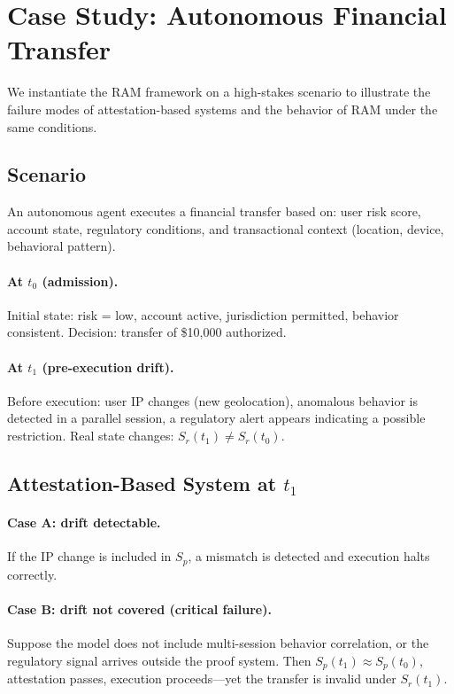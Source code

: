 \documentclass[11pt]{article}
\newcommand{\Sr}{S_r}
\newcommand{\Sp}{S_p}
\begin{document}
\section{Case Study: Autonomous Financial Transfer}
\label{sec:case}

We instantiate the RAM framework on a high-stakes scenario to illustrate the
failure modes of attestation-based systems and the behavior of RAM under the
same conditions.

\subsection{Scenario}

An autonomous agent executes a financial transfer based on:
user risk score, account state, regulatory conditions, and transactional context
(location, device, behavioral pattern).

\paragraph{At $t_0$ (admission).}
Initial state: risk = low, account active, jurisdiction permitted,
behavior consistent.
Decision: transfer of \$10,000 authorized.

\paragraph{At $t_1$ (pre-execution drift).}
Before execution: user IP changes (new geolocation), anomalous behavior
is detected in a parallel session, a regulatory alert appears indicating a
possible restriction.
Real state changes: $\Sr(t_1) \neq \Sr(t_0)$.

\subsection{Attestation-Based System at $t_1$}

\paragraph{Case A: drift detectable.}
If the IP change is included in $\Sp$, a mismatch is detected and execution
halts correctly.

\paragraph{Case B: drift not covered (critical failure).}
Suppose the model does not include multi-session behavior correlation, or the
regulatory signal arrives outside the proof system.
Then $\Sp(t_1) \approx \Sp(t_0)$, attestation passes, execution proceeds---yet
the transfer is invalid under $\Sr(t_1)$.
\end{document}
